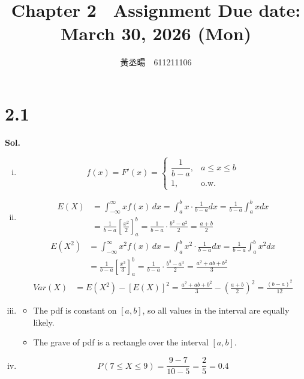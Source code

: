 \documentclass[a4paper, 12pt]{article}  %
\title{Chapter 2　Assignment \small{Due date: March 30, 2026 (Mon)}}
\author{黃丞暘　611211106}
\date{}
\begin{document}
\maketitle %

\section*{2.1}
\textbf{Sol.}
    \begin{enumerate}[i.]
        \item 
        $$
        f(x)=F'(x)=\begin{cases}
            \dfrac{1}{b-a}, 
            & a\le x\le b\\
            1, & \text{o.w.}
        \end{cases}
        $$
        \item 
        \begin{align*}
            E(X) &= \int_{-\infty}^{\infty} x f(x)\,dx
            = \int_a^b x \cdot \frac{1}{b-a}dx
            = \frac{1}{b-a}\int_a^b xdx \\[6pt]
            &= \frac{1}{b-a}\left[\frac{x^2}{2}\right]_a^b
            = \frac{1}{b-a}\cdot \frac{b^2-a^2}{2}
            = \frac{a+b}{2}
        \end{align*}
        \begin{align*}
            E(X^2) &= \int_{-\infty}^{\infty} x^2 f(x)\,dx
            = \int_a^b x^2 \cdot \frac{1}{b-a}dx
            = \frac{1}{b-a}\int_a^b x^2dx \\[6pt]
            &= \frac{1}{b-a}\left[\frac{x^3}{3}\right]_a^b
            = \frac{1}{b-a}\cdot \frac{b^3-a^3}{2}
            = \frac{a^2+ab+b^2}{3}
        \end{align*}
        \begin{align*}
            Var(X) &= E(X^2)-[E(X)]^2
            = \frac{a^2+ab+b^2}{3}-\left(\frac{a+b}{2}\right)^2
            = \frac{(b-a)^2}{12}
        \end{align*}
        \item 
        \begin{itemize}
            \item The pdf is constant on $[a, b]$, so all values in the interval are equally likely.
            \item The grave of pdf is a rectangle over the interval $[a, b]$.
        \end{itemize}
        \item $$P(7\le X\le 9)=\frac{9-7}{10-5}=\frac{2}{5}=0.4$$
    \end{enumerate}
\end{document}
